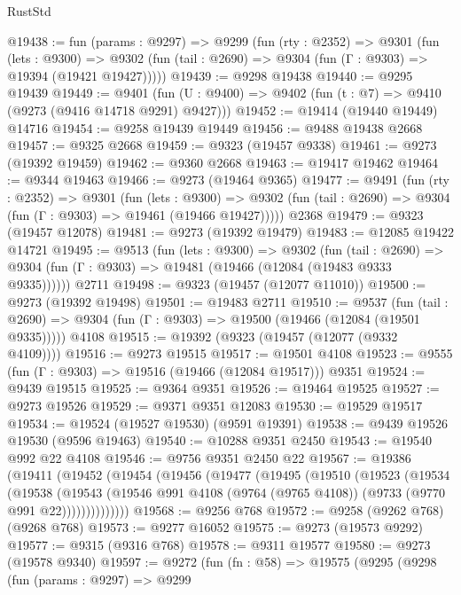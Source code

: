 \begin{lexlean}{RustStd}
\begin{coremodule}
{\begin{coremodule}
{{{{{{{{{{{{{{{{{{{{{{{{{{{{{{{{{{{{{{{{{{{{{{{{{{{{{{{@19438 := fun (params : @9297) =>
  @9299
    (fun (rty : @2352) =>
    @9301
      (fun (lets : @9300) =>
      @9302 (fun (tail : @2690) => @9304 (fun (Γ : @9303) => @19394 (@19421 @19427)))))
@19439 := @9298 @19438
@19440 := @9295 @19439
@19449 := @9401
    (fun (U : @9400) => @9402 (fun (t : @7) => @9410 (@9273 (@9416 @14718 @9291) @9427)))
@19452 := @19414 (@19440 @19449) @14716
@19454 := @9258 @19439 @19449
@19456 := @9488 @19438 @2668
@19457 := @9325 @2668
@19459 := @9323 (@19457 @9338)
@19461 := @9273 (@19392 @19459)
@19462 := @9360 @2668
@19463 := @19417 @19462
@19464 := @9344 @19463
@19466 := @9273 (@19464 @9365)
@19477 := @9491
    (fun (rty : @2352) =>
    @9301
      (fun (lets : @9300) =>
      @9302 (fun (tail : @2690) => @9304 (fun (Γ : @9303) => @19461 (@19466 @19427)))))
    @2368
@19479 := @9323 (@19457 @12078)
@19481 := @9273 (@19392 @19479)
@19483 := @12085 @19422 @14721
@19495 := @9513
    (fun (lets : @9300) =>
    @9302
      (fun (tail : @2690) =>
      @9304 (fun (Γ : @9303) => @19481 (@19466 (@12084 (@19483 @9333 @9335))))))
    @2711
@19498 := @9323 (@19457 (@12077 @11010))
@19500 := @9273 (@19392 @19498)
@19501 := @19483 @2711
@19510 := @9537
    (fun (tail : @2690) => @9304 (fun (Γ : @9303) => @19500 (@19466 (@12084 (@19501 @9335)))))
    @4108
@19515 := @19392 (@9323 (@19457 (@12077 (@9332 @4109))))
@19516 := @9273 @19515
@19517 := @19501 @4108
@19523 := @9555 (fun (Γ : @9303) => @19516 (@19466 (@12084 @19517))) @9351
@19524 := @9439 @19515
@19525 := @9364 @9351
@19526 := @19464 @19525
@19527 := @9273 @19526
@19529 := @9371 @9351 @12083
@19530 := @19529 @19517
@19534 := @19524 (@19527 @19530) (@9591 @19391)
@19538 := @9439 @19526 @19530 (@9596 @19463)
@19540 := @10288 @9351 @2450
@19543 := @19540 @992 @22 @4108
@19546 := @9756 @9351 @2450 @22
@19567 := @19386
    (@19411
      (@19452
        (@19454
          (@19456
            (@19477
              (@19495
                (@19510
                  (@19523
                    (@19534
                      (@19538
                        (@19543
                          (@19546
                            @991
                            @4108
                            (@9764 (@9765 @4108))
                            (@9733 (@9770 @991 @22))))))))))))))
@19568 := @9256 @768
@19572 := @9258 (@9262 @768) (@9268 @768)
@19573 := @9277 @16052
@19575 := @9273 (@19573 @9292)
@19577 := @9315 (@9316 @768)
@19578 := @9311 @19577
@19580 := @9273 (@19578 @9340)
@19597 := @9272
    (fun (fn : @58) =>
    @19575
      (@9295
        (@9298
          (fun (params : @9297) =>
          @9299
}}}}}}}}}}}}}}}}}}}}}}}}}}}}}}}}}}}}}}}}}}}}}}}}}}}}}}}
\end{coremodule}}
\end{coremodule}
\end{lexlean}
